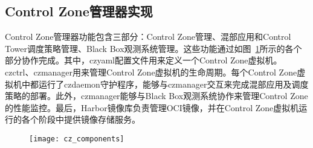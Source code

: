 \subsection{Control Zone管理器实现}


Control Zone管理器功能包含三部分：Control Zone管理、混部应用和Control Tower调度策略管理、Black Box观测系统管理。这些功能通过如图~\ref{fig:cz_components}所示的各个部分协作完成。其中，czyaml配置文件用来定义一个Control Zone虚拟机。czctrl、czmanager用来管理Control Zone虚拟机的生命周期。每个Control Zone虚拟机中都运行了czdaemon守护程序，能够与czmanager交互来完成混部应用及调度策略的部署。此外，czmanager能够与Black Box观测系统协作来管理Control Zone的性能监控。最后，Harbor镜像库\citep{harbor}负责管理OCI镜像，并在Control Zone虚拟机运行的各个阶段中提供镜像存储服务。

\begin{figure}[!htbp]
    \centering
    \texttt{[image: cz\_components]}
    \label{fig:cz_components}
\end{figure}

